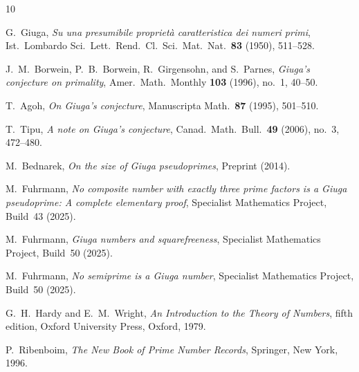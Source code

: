 \documentclass[12pt,a4paper]{amsart}
\theoremstyle{definition}
\begin{document}
\begin{thebibliography}{10}

G.~Giuga,
\emph{Su una presumibile propriet\`a caratteristica dei numeri primi},
Ist.\ Lombardo Sci.\ Lett.\ Rend.\ Cl.\ Sci.\ Mat.\ Nat.\ \textbf{83}
(1950), 511--528.

J.~M.~Borwein, P.~B.~Borwein, R.~Girgensohn, and S.~Parnes,
\emph{Giuga's conjecture on primality},
Amer.\ Math.\ Monthly \textbf{103} (1996), no.\ 1, 40--50.

T.~Agoh,
\emph{On Giuga's conjecture},
Manuscripta Math.\ \textbf{87} (1995), 501--510.

T.~Tipu,
\emph{A note on Giuga's conjecture},
Canad.\ Math.\ Bull.\ \textbf{49} (2006), no.\ 3, 472--480.

M.~Bednarek,
\emph{On the size of Giuga pseudoprimes},
Preprint (2014).

M.~Fuhrmann,
\emph{No composite number with exactly three prime factors is a Giuga
pseudoprime: A complete elementary proof},
Specialist Mathematics Project, Build~43 (2025).

M.~Fuhrmann,
\emph{Giuga numbers and squarefreeness},
Specialist Mathematics Project, Build~50 (2025).

M.~Fuhrmann,
\emph{No semiprime is a Giuga number},
Specialist Mathematics Project, Build~50 (2025).

G.~H.~Hardy and E.~M.~Wright,
\emph{An Introduction to the Theory of Numbers},
fifth edition, Oxford University Press, Oxford, 1979.

P.~Ribenboim,
\emph{The New Book of Prime Number Records},
Springer, New York, 1996.

\end{thebibliography}
\end{document}
